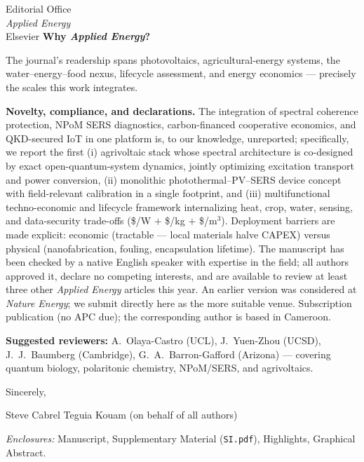 \documentclass[10pt]{letter}
\begin{document}
\begin{letter}{Editorial Office\\
\textit{Applied Energy}\\
Elsevier}
\noindent\textbf{Why \textit{Applied Energy}?}

The journal's readership spans photovoltaics, agricultural-energy systems, the water--energy--food nexus, lifecycle assessment, and energy economics --- precisely the scales this work integrates.

\noindent\textbf{Novelty, compliance, and declarations.} The integration of spectral coherence protection, NPoM SERS diagnostics, carbon-financed cooperative economics, and QKD-secured IoT in one platform is, to our knowledge, unreported; specifically, we report the first (i) agrivoltaic stack whose spectral architecture is co-designed by exact open-quantum-system dynamics, jointly optimizing excitation transport and power conversion, (ii) monolithic photothermal--PV--SERS device concept with field-relevant calibration in a single footprint, and (iii) multifunctional techno-economic and lifecycle framework internalizing heat, crop, water, sensing, and data-security trade-offs (\$/W $+$ \$/kg $+$ \$/m$^3$). Deployment barriers are made explicit: economic (tractable --- local materials halve CAPEX) versus physical (nanofabrication, fouling, encapsulation lifetime). The manuscript has been checked by a native English speaker with expertise in the field; all authors approved it, declare no competing interests, and are available to review at least three other \textit{Applied Energy} articles this year. An earlier version was considered at \textit{Nature Energy}; we submit directly here as the more suitable venue. Subscription publication (no APC due); the corresponding author is based in Cameroon.

\noindent\textbf{Suggested reviewers:} A.~Olaya-Castro (UCL), J.~Yuen-Zhou (UCSD), J.~J.~Baumberg (Cambridge), G.~A.~Barron-Gafford (Arizona) --- covering quantum biology, polaritonic chemistry, NPoM/SERS, and agrivoltaics.

\medskip
Sincerely,

Steve Cabrel Teguia Kouam (on behalf of all authors)

\vspace{-0.9em}
\textit{Enclosures:} Manuscript, Supplementary Material (\texttt{SI.pdf}), Highlights, Graphical Abstract.

\end{letter}
\end{document}
